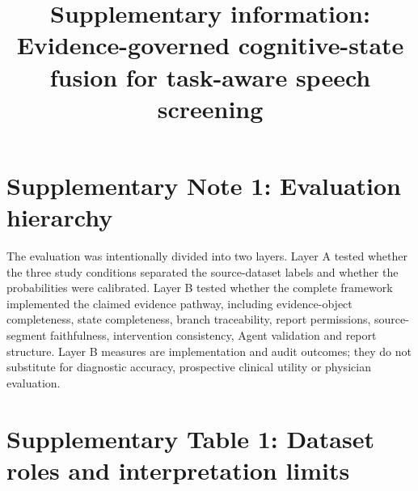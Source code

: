 \documentclass[pdflatex,sn-nature]{sn-jnl}
\begin{document}
\title{Supplementary information: Evidence-governed cognitive-state fusion for task-aware speech screening}
\author*[1]{ }
\maketitle

\section*{Supplementary Note 1: Evaluation hierarchy}

The evaluation was intentionally divided into two layers. Layer A tested whether the three study conditions separated the source-dataset labels and whether the probabilities were calibrated. Layer B tested whether the complete framework implemented the claimed evidence pathway, including evidence-object completeness, state completeness, branch traceability, report permissions, source-segment faithfulness, intervention consistency, Agent validation and report structure. Layer B measures are implementation and audit outcomes; they do not substitute for diagnostic accuracy, prospective clinical utility or physician evaluation.

\section*{Supplementary Table 1: Dataset roles and interpretation limits}
\end{document}
